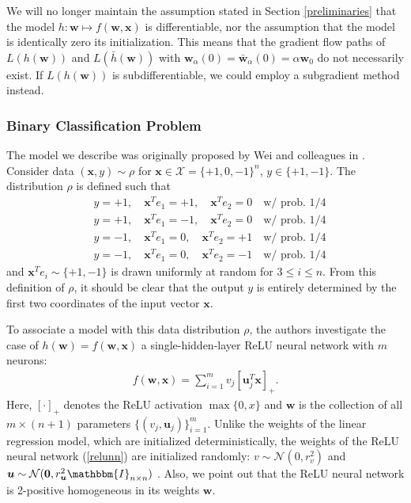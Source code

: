 \documentclass{article}
\begin{document}
We will no longer maintain the assumption stated in Section \ref{preliminaries} that the model $h: \boldsymbol{w} \mapsto f(\boldsymbol{w}, \boldsymbol{x})$ is differentiable, nor the assumption that the model is identically zero its initialization. This means that the gradient flow paths of $L(h(\boldsymbol{w}))$ and $L(\bar{h}(\boldsymbol{w}))$ with $\boldsymbol{w}_{\alpha}(0) = \boldsymbol{\bar{w}}_{\alpha}(0) = \alpha \boldsymbol{w}_0$ do not necessarily exist. If $L(h(\boldsymbol{w}))$ is subdifferentiable, we could employ a subgradient method instead.

\subsubsection{Binary Classification Problem}

The model we describe was originally proposed by Wei and colleagues in \cite{wei2019regularization}. Consider data $(\boldsymbol{x}, y) \sim \rho$ for $\boldsymbol{x} \in \mathcal{X} = \{ +1, 0, -1 \}^n$, $y \in \{+1, -1\}$. The distribution $\rho$ is defined such that 
\begin{align*}
    &y = +1, \quad \boldsymbol{x}^Te_1 = +1, \quad \boldsymbol{x}^Te_2 = 0 \quad \text{w/ prob. 1/4}\\
    &y = +1, \quad \boldsymbol{x}^Te_1 = -1, \quad \boldsymbol{x}^Te_2 = 0 \quad \text{w/ prob. 1/4}\\
    &y = -1, \quad \boldsymbol{x}^Te_1 = 0, \quad \boldsymbol{x}^Te_2 = +1 \quad \text{w/ prob. 1/4}\\
    &y = -1, \quad \boldsymbol{x}^Te_1 = 0, \quad \boldsymbol{x}^Te_2 = -1 \quad \text{w/ prob. 1/4}
\end{align*}
and $\boldsymbol{x}^Te_i \sim \{+1, -1 \}$ is drawn uniformly at random for $3 \leq i \leq n$. From this definition of $\rho$, it should be clear that the output $y$ is entirely determined by the first two coordinates of the input vector $\boldsymbol{x}$.

To associate a model with this data distribution $\rho$, the authors investigate the case of $h(\boldsymbol{w}) = f(\boldsymbol{w}, \boldsymbol{x})$ a single-hidden-layer ReLU neural network with $m$ neurons:
\begin{align}\label{relunn}
    f(\boldsymbol{w}, \boldsymbol{x}) = \sum_{i=1}^m v_j[\boldsymbol{u}_j^T\boldsymbol{x}]_+.
\end{align}
Here, $[\cdot]_+$ denotes the ReLU activation $\max\{0, x \}$ and $\boldsymbol{w}$ is the collection of all $m \times (n+1)$ parameters $\{ (v_j, \boldsymbol{u}_j) \}_{i=1}^m$. Unlike the weights of the linear regression model, which are initialized deterministically, the weights of the ReLU neural network (\ref{relunn}) are initialized randomly: $v \sim \mathcal{N}(0, r_v^2)$ and $\boldsymbol{u} \sim \mathcal{N}(\boldsymbol{0}, r_{\boldsymbol{u}}^2\mathbbm{I}_{n \times n})$ \cite{wei2019regularization}. Also, we point out that the ReLU neural network is 2-positive homogeneous in its weights $\boldsymbol{w}$. 
\end{document}

